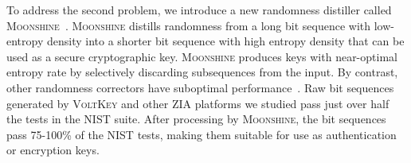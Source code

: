 \documentclass[10pt,onecolumn]{article}
\begin{document}
To address the second problem, we introduce a new randomness distiller called \textsc{Moonshine}~\cite{moonshine}.
\textsc{Moonshine} distills randomness from a long bit sequence with low-entropy density into a shorter bit sequence with high entropy density that can be used as a secure cryptographic key.
\textsc{Moonshine} produces keys with near-optimal entropy rate by selectively discarding subsequences from the input.
By contrast, other randomness correctors have suboptimal performance~\cite{drng}.
Raw bit sequences generated by \textsc{VoltKey} and other ZIA platforms we studied pass just over half the tests in the NIST suite.
After processing by \textsc{Moonshine}, the bit sequences pass 75-100\% of the NIST tests, making them suitable for use as authentication or encryption keys.







 
\end{document}
